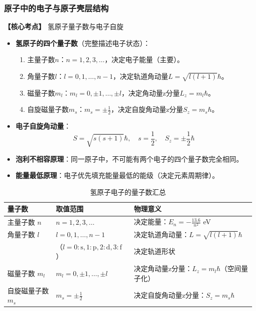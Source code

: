 \subsubsection{原子中的电子与原子壳层结构}
\textbf{【核心考点】} 氢原子量子数与电子自旋 \par\vspace{0.3em}
\begin{itemize}
    \item \textbf{氢原子的四个量子数}（完整描述电子状态）：
          \begin{enumerate}
              \item 主量子数$n$：$n=1,2,3,\dots$，决定电子能量（主要）。
              \item 角量子数$l$：$l=0,1,\dots,n-1$，决定轨道角动量$L=\sqrt{l(l+1)}\hbar$。
              \item 磁量子数$m_l$：$m_l=0,\pm1,\dots,\pm l$，决定角动量z分量$L_z=m_l\hbar$。
              \item 自旋磁量子数$m_s$：$m_s=\pm\frac{1}{2}$，决定自旋角动量z分量$S_z=m_s\hbar$。
          \end{enumerate}
    \item \textbf{电子自旋角动量}：
          \[
          S = \sqrt{s(s+1)}\hbar,\quad s=\frac{1}{2},\quad S_z = \pm\frac{1}{2}\hbar
          \]
    \item \textbf{泡利不相容原理}：同一原子中，不可能有两个电子的四个量子数完全相同。
    \item \textbf{能量最低原理}：电子优先填充能量最低的能级（决定元素周期律）。
\end{itemize}

\begin{table}[htbp]
    \centering
    \scriptsize
    \renewcommand{\arraystretch}{1.5}
    \begin{tabular}{@{}p{2.2cm}|p{3cm}|p{5.6cm}@{}}
        \toprule
        \rowcolor[RGB]{230,240,250} 量子数 & 取值范围 & 物理意义 \\
        \midrule
        主量子数 $n$ & $n=1,2,3,\dots$ & 决定能量：$E_n = -\frac{13.6}{n^2}$ eV \\
        \midrule
        角量子数 $l$ & $l=0,1,\dots,n-1$ & 决定轨道角动量：$L=\sqrt{l(l+1)}\hbar$ \\
                      & （$l=0:\text{s},1:\text{p},2:\text{d},3:\text{f}$） & 决定轨道形状 \\
        \midrule
        磁量子数 $m_l$ & $m_l=0,\pm1,\dots,\pm l$ & 决定角动量z分量：$L_z=m_l\hbar$（空间量子化） \\
        \midrule
        自旋磁量子数 $m_s$ & $m_s=\pm\frac{1}{2}$ & 决定自旋角动量z分量：$S_z=m_s\hbar$ \\
        \bottomrule
    \end{tabular}
    \caption{氢原子电子的量子数汇总}
    \label{tab:quantum_number}
\end{table}
\vspace{0.5em}

